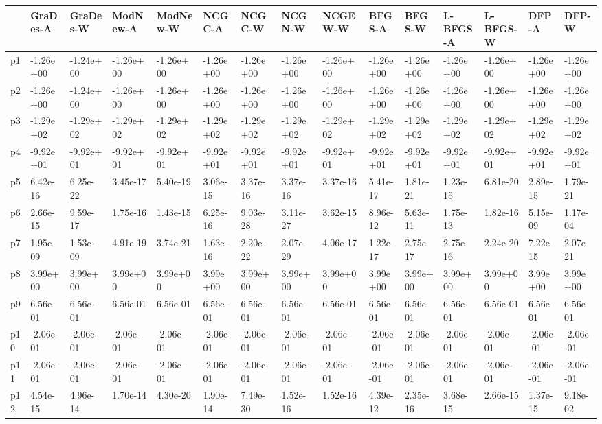 \begin{tabular}{lllllllllllllll}
\toprule
{} &  GraDes-A  &  GraDes-W  &  ModNew-A  &  ModNew-W  &    NCGC-A  &    NCGC-W  &    NCGN-W  &   NCGEW-W  &    BFGS-A  &    BFGS-W  &  L-BFGS-A  &  L-BFGS-W  &     DFP-A  &     DFP-W  \\
\midrule
p1  &  -1.26e+00 &  -1.24e+00 &  -1.26e+00 &  -1.26e+00 &  -1.26e+00 &  -1.26e+00 &  -1.26e+00 &  -1.26e+00 &  -1.26e+00 &  -1.26e+00 &  -1.26e+00 &  -1.26e+00 &  -1.26e+00 &  -1.26e+00 \\
p2  &  -1.26e+00 &  -1.24e+00 &  -1.26e+00 &  -1.26e+00 &  -1.26e+00 &  -1.26e+00 &  -1.26e+00 &  -1.26e+00 &  -1.26e+00 &  -1.26e+00 &  -1.26e+00 &  -1.26e+00 &  -1.26e+00 &  -1.26e+00 \\
p3  &  -1.29e+02 &  -1.29e+02 &  -1.29e+02 &  -1.29e+02 &  -1.29e+02 &  -1.29e+02 &  -1.29e+02 &  -1.29e+02 &  -1.29e+02 &  -1.29e+02 &  -1.29e+02 &  -1.29e+02 &  -1.29e+02 &  -1.29e+02 \\
p4  &  -9.92e+01 &  -9.92e+01 &  -9.92e+01 &  -9.92e+01 &  -9.92e+01 &  -9.92e+01 &  -9.92e+01 &  -9.92e+01 &  -9.92e+01 &  -9.92e+01 &  -9.92e+01 &  -9.92e+01 &  -9.92e+01 &  -9.92e+01 \\
p5  &   6.42e-16 &   6.25e-22 &   3.45e-17 &   5.40e-19 &   3.06e-15 &   3.37e-16 &   3.37e-16 &   3.37e-16 &   5.41e-17 &   1.81e-21 &   1.23e-15 &   6.81e-20 &   2.89e-15 &   1.79e-21 \\
p6  &   2.66e-15 &   9.59e-17 &   1.75e-16 &   1.43e-15 &   6.25e-16 &   9.03e-28 &   3.11e-27 &   3.62e-15 &   8.96e-12 &   5.63e-11 &   1.75e-13 &   1.82e-16 &   5.15e-09 &   1.17e-04 \\
p7  &   1.95e-09 &   1.53e-09 &   4.91e-19 &   3.74e-21 &   1.63e-16 &   2.20e-22 &   2.07e-29 &   4.06e-17 &   1.22e-17 &   2.75e-17 &   2.75e-16 &   2.24e-20 &   7.22e-15 &   2.07e-21 \\
p8  &   3.99e+00 &   3.99e+00 &   3.99e+00 &   3.99e+00 &   3.99e+00 &   3.99e+00 &   3.99e+00 &   3.99e+00 &   3.99e+00 &   3.99e+00 &   3.99e+00 &   3.99e+00 &   3.99e+00 &   3.99e+00 \\
p9  &   6.56e-01 &   6.56e-01 &   6.56e-01 &   6.56e-01 &   6.56e-01 &   6.56e-01 &   6.56e-01 &   6.56e-01 &   6.56e-01 &   6.56e-01 &   6.56e-01 &   6.56e-01 &   6.56e-01 &   6.56e-01 \\
p10 &  -2.06e-01 &  -2.06e-01 &  -2.06e-01 &  -2.06e-01 &  -2.06e-01 &  -2.06e-01 &  -2.06e-01 &  -2.06e-01 &  -2.06e-01 &  -2.06e-01 &  -2.06e-01 &  -2.06e-01 &  -2.06e-01 &  -2.06e-01 \\
p11 &  -2.06e-01 &  -2.06e-01 &  -2.06e-01 &  -2.06e-01 &  -2.06e-01 &  -2.06e-01 &  -2.06e-01 &  -2.06e-01 &  -2.06e-01 &  -2.06e-01 &  -2.06e-01 &  -2.06e-01 &  -2.06e-01 &  -2.06e-01 \\
p12 &   4.54e-15 &   4.96e-14 &   1.70e-14 &   4.30e-20 &   1.90e-14 &   7.49e-30 &   1.52e-16 &   1.52e-16 &   4.39e-12 &   2.35e-16 &   3.68e-15 &   2.66e-15 &   1.37e-15 &   9.18e-02 \\
\bottomrule
\end{tabular}
